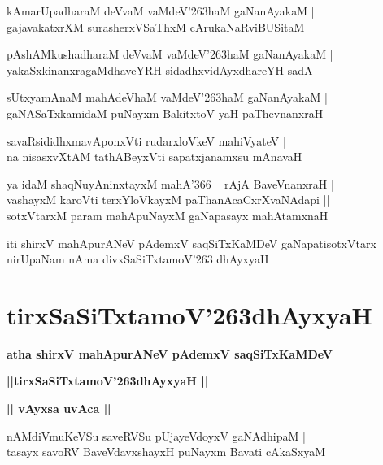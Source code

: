 \documentclass[twoside,12pt,openright]{book}
\def\S{\char'263}
\newcounter{shloka}[chapter]
\def\uvaca#1{\centerline{{\large\textbf{#1}}}}
\begin{document}
\begin{shloka}%
kAmarUpadharaM deVvaM vaMdeV\S haM gaNanAyakaM |\\
gajavakatxrXM surasherxVSaThxM cArukaNaRviBUSitaM
\end{shloka}

\begin{shloka}%
pAshAMkushadharaM deVvaM vaMdeV\S haM gaNanAyakaM |\\
yakaSxkinanxragaMdhaveYRH sidadhxvidAyxdhareYH sadA 
\end{shloka}

\begin{shloka}%
sUtxyamAnaM mahAdeVhaM vaMdeV\S haM gaNanAyakaM |\\
gaNASaTxkamidaM puNayxm BakitxtoV yaH paThevnanxraH 
\end{shloka}

\begin{shloka}%
savaRsididhxmavAponxVti rudarxloVkeV mahiVyateV |\\
na nisasxvXtAM tathABeyxVti sapatxjanamxsu mAnavaH 
\end{shloka}

\begin{shloka}%
ya idaM shaqNuyAninxtayxM mahA\char'366 ~ rAjA BaveVnanxraH |\\
vashayxM karoVti terxYloVkayxM paThanAcaCxrXvaNAdapi ||\\
sotxVtarxM param mahApuNayxM gaNapasayx mahAtamxnaH 
\end{shloka}

\begin{center}
iti shirxV mahApurANeV pAdemxV saqSiTxKaMDeV gaNapatisotxVtarx nirUpaNam nAma divxSaSiTxtamoV\S 
dhAyxyaH
\end{center}

\chapter{tirxSaSiTxtamoV\S dhAyxyaH}

\begin{center}
{\LARGE\bfseries atha shirxV mahApurANeV pAdemxV saqSiTxKaMDeV}
\end{center}

\begin{center}
{\LARGE\bfseries ||tirxSaSiTxtamoV\S dhAyxyaH || }
\end{center}

\uvaca{|| vAyxsa uvAca ||}

\begin{shloka}%
nAMdiVmuKeVSu saveRVSu pUjayeVdoyxV gaNAdhipaM |\\
tasayx savoRV BaveVdavxshayxH puNayxm Bavati cAkaSxyaM 
\end{shloka}
\end{document}
